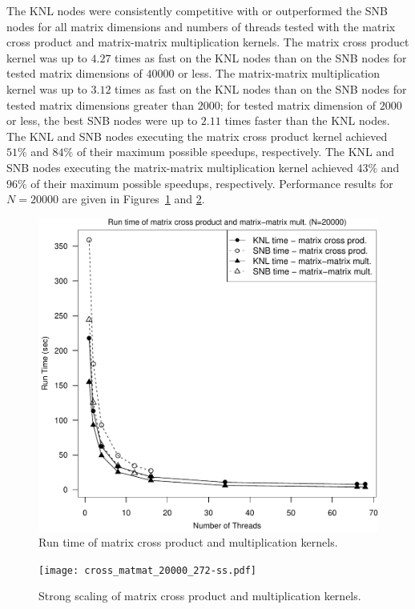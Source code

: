 The KNL nodes were consistently competitive with or outperformed the
  SNB nodes for all matrix dimensions and numbers of threads tested
  with the matrix cross product and matrix-matrix multiplication
  kernels.
The matrix cross product kernel was up to $4.27$ times as fast on the KNL
  nodes than on the SNB nodes for tested matrix dimensions of $40000$ or less.
The matrix-matrix multiplication kernel was up to $3.12$ times as fast on the
  KNL nodes than on the SNB nodes for tested matrix dimensions greater than
  $2000$; for tested matrix dimension of $2000$ or less, the best SNB nodes were
  up to $2.11$ times faster than the KNL nodes.
The KNL and SNB nodes executing the matrix cross product kernel achieved $51\%$
  and $84\%$ of their maximum possible speedups, respectively.
The KNL and SNB nodes executing the matrix-matrix multiplication kernel achieved
  $43\%$ and $96\%$ of their maximum possible speedups, respectively.
Performance results for $N=20000$ are given in Figures~\ref{fig:crossMatmatTime}
  and \ref{fig:crossMatmatScale}.
\begin{figure}
\includegraphics[height=\columnwidth, width=\columnwidth]{cross_matmat_20000_68-rt.pdf}
\caption{Run time of matrix cross product and multiplication kernels.}
\label{fig:crossMatmatTime}
\end{figure}
\begin{figure}
\texttt{[image: cross\_matmat\_20000\_272-ss.pdf]}
\caption{Strong scaling of matrix cross product and multiplication kernels.}
\label{fig:crossMatmatScale}
\end{figure}

